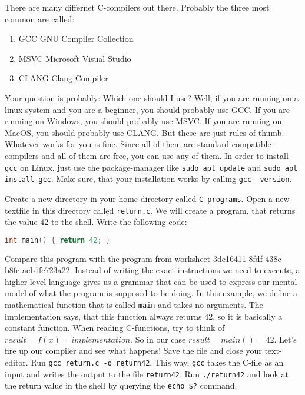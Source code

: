 \documentclass{dcbl/challenge}
\begin{document}
\begin{aufgabe}
    There are many differnet C-compilers out there. 
    Probably the three most common are called:
    \begin{enumerate}
        \item GCC GNU Compiler Collection
        \item MSVC Microsoft Visual Studio
        \item CLANG Clang Compiler
    \end{enumerate}
    Your question is probably: Which one should I use? 
    Well, if you are running on a linux system and you are a beginner, you should probably use GCC.
    If you are running on Windows, you should probably use MSVC.
    If you are running on MacOS, you should probably use CLANG.
    But these are just rules of thumb. 
    Whatever works for you is fine. 
    Since all of them are standard-compatible-compilers and all of them are free, you can use any of them.
    In order to install \texttt{gcc} on Linux, just use the package-manager like \texttt{sudo apt update} and \texttt{sudo apt install gcc}.
    Make sure, that your installation works by calling \texttt{gcc --version}.
\end{aufgabe}

\begin{aufgabe}
    Create a new directory in your home directory called \texttt{C-programs}.
    Open a new textfile in this directory called \texttt{return.c}.
    We will create a program, that returns the value 42 to the shell.
    Write the following code:
    \begin{lstlisting}[language={C}, caption={Return 42 in C}]
        int main() { return 42; }
    \end{lstlisting}
    Compare this program with the program from worksheet \href{https://github.com/bjoekeldude/3dc16411-8fdf-438c-b8fc-aeb1fc723a22}{3dc16411-8fdf-438c-b8fc-aeb1fc723a22}.
    Instead of writing the exact instructions we need to execute, a higher-level-language gives us a grammar that can be used to express our mental model of what the program is supposed to be doing. 
    In this example, we define a mathematical function that is called \texttt{main} and takes no arguments.
    The implementation says, that this function always returns 42, so it is basically a constant function.
    When reading C-functions, try to think of $result = f(x) = implementation$.
    So in our case $result = main( ) = 42$.
    Let's fire up our compiler and see what happens!
    Save the file and close your text-editor. 
    Run \texttt{gcc return.c -o return42}. 
    This way, \texttt{gcc} takes the C-file as an input and writes the output to the file \texttt{return42}.
    Run \texttt{./return42} and look at the return value in the shell by querying the \texttt{echo \$?} command.
\end{aufgabe}
\end{document}
